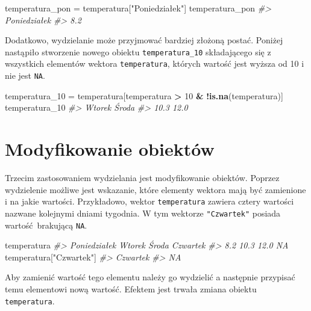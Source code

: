 \documentclass[paper=6in:9in,pagesize=pdftex,headinclude=on,footinclude=on,10pt]{scrbook}
\newenvironment{Shaded}{\begin{snugshade}}{\end{snugshade}}
\newcommand{\CommentTok}[1]{\textcolor[rgb]{0.56,0.35,0.01}{\textit{#1}}}
\newcommand{\DecValTok}[1]{\textcolor[rgb]{0.00,0.00,0.81}{#1}}
\newcommand{\KeywordTok}[1]{\textcolor[rgb]{0.13,0.29,0.53}{\textbf{#1}}}
\newcommand{\NormalTok}[1]{#1}
\newcommand{\OperatorTok}[1]{\textcolor[rgb]{0.81,0.36,0.00}{\textbf{#1}}}
\newcommand{\StringTok}[1]{\textcolor[rgb]{0.31,0.60,0.02}{#1}}
\begin{document}
\begin{Shaded}
\begin{Highlighting}[]
\NormalTok{temperatura_pon =}\StringTok{ }\NormalTok{temperatura[}\StringTok{"Poniedziałek"}\NormalTok{]}
\NormalTok{temperatura_pon}
\CommentTok{#> Poniedziałek }
\CommentTok{#>          8.2}
\end{Highlighting}
\end{Shaded}

Dodatkowo, wydzielanie może przyjmować bardziej złożoną postać.
Poniżej nastąpiło stworzenie nowego obiektu \texttt{temperatura\_10} składającego się z wszystkich elementów wektora \texttt{temperatura}, których wartość jest wyższa od 10 i nie jest \texttt{NA}.

\begin{Shaded}
\begin{Highlighting}[]
\NormalTok{temperatura_}\DecValTok{10}\NormalTok{ =}\StringTok{ }\NormalTok{temperatura[temperatura }\OperatorTok{>}\StringTok{ }\DecValTok{10} \OperatorTok{&}\StringTok{ }\OperatorTok{!}\KeywordTok{is.na}\NormalTok{(temperatura)]}
\NormalTok{temperatura_}\DecValTok{10}
\CommentTok{#> Wtorek  Środa }
\CommentTok{#>   10.3   12.0}
\end{Highlighting}
\end{Shaded}

\hypertarget{mo-vector}{%
\section{Modyfikowanie obiektów}\label{mo-vector}}

Trzecim zastosowaniem wydzielania jest modyfikowanie obiektów.
Poprzez wydzielenie możliwe jest wskazanie, które elementy wektora mają być zamienione i na jakie wartości.
Przykładowo, wektor \texttt{temperatura} zawiera cztery wartości nazwane kolejnymi dniami tygodnia.
W tym wektorze \texttt{"Czwartek"} posiada wartość~brakującą \texttt{NA}.

\begin{Shaded}
\begin{Highlighting}[]
\NormalTok{temperatura}
\CommentTok{#> Poniedziałek       Wtorek        Środa     Czwartek }
\CommentTok{#>          8.2         10.3         12.0           NA}
\NormalTok{temperatura[}\StringTok{"Czwartek"}\NormalTok{]}
\CommentTok{#> Czwartek }
\CommentTok{#>       NA}
\end{Highlighting}
\end{Shaded}

Aby zamienić wartość tego elementu należy go wydzielić a następnie przypisać temu elementowi nową wartość.
Efektem jest trwała zmiana obiektu \texttt{temperatura}.
\end{document}
